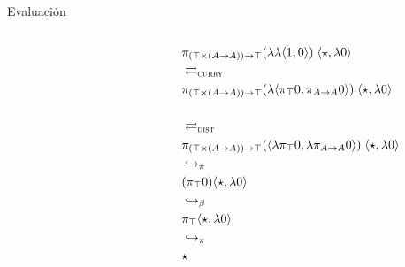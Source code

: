 \begin{frame}{Evaluación}
	\begin{columns}
		\begin{column}{0.5\textwidth}
		\end{column}
		\begin{column}{0.5\textwidth}
			\fontsize{7}{8}\selectfont
			\vspace{4.5em}
			\begin{align*}
				&\pi_{(\top \times (A \rightarrow A) ) \rightarrow \top} (\lambda \lambda \langle 1, 0 \rangle) \; \langle \star , \lambda 0 \rangle \\
				&\rightleftarrows_{\textsc{curry}} \\
				&\pi_{(\top \times (A \rightarrow A) ) \rightarrow \top} (\lambda \langle \pi_\top 0 , \pi_{A \rightarrow A} 0 \rangle) \; \langle \star , \lambda 0 \rangle \\
				\\
				&\rightleftarrows_{\textsc{dist}} \\
				&\pi_{(\top \times (A \rightarrow A) ) \rightarrow \top} (\langle \lambda \pi_\top 0 , \lambda \pi_{A \rightarrow A} 0 \rangle) \; \langle \star , \lambda 0 \rangle \\
				&\hookrightarrow_\pi \\
				&(\pi_\top 0) \langle \star , \lambda 0 \rangle \\
				&\hookrightarrow_\beta \\
				&\pi_\top \langle \star , \lambda 0 \rangle \\
				&\hookrightarrow_\pi \\
				&\star
			\end{align*}
		\end{column}
	\end{columns}
\end{frame}